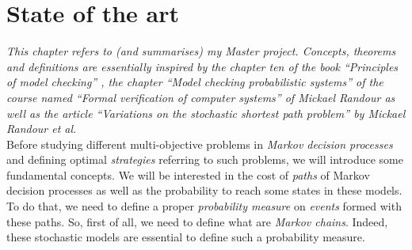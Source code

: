 \chapter{State of the art} \label{preliminaries}
\textit{This chapter refers to (and summarises) my Master project. Concepts, theorems and definitions are essentially inspired by the chapter ten of the book ``Principles of model checking'' \cite{PMC}, the chapter ``Model checking probabilistic systems'' of the course named ``Formal verification of computer systems'' of Mickael Randour \cite{MRV} as well as the article ``Variations on the stochastic shortest path problem'' \cite{DBLP:journals/corr/RandourRS14a} by Mickael Randour et al.} \\

Before studying different multi-objective problems in \textit{Markov decision
processes} and defining optimal \textit{strategies} referring to such problems, we will introduce some fundamental concepts. We will be interested in the cost of \textit{paths} of Markov decision processes as well as the probability to reach some states in these models.
To do that, we need to define a proper \textit{probability measure} on \textit{events} formed with these paths.
So, first of all, we need to define what are \textit{Markov chains}.
Indeed, these stochastic models are essential to define such a probability measure.

